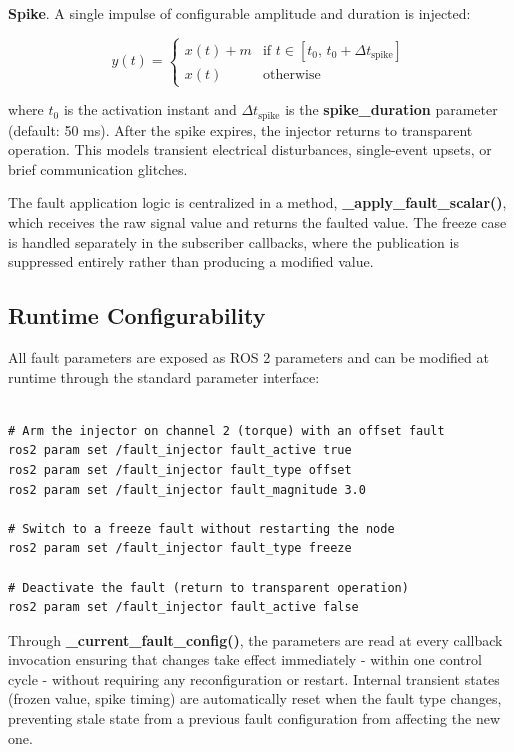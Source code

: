 \textbf{Spike}. A single impulse of configurable amplitude and duration is injected:

\begin{equation}
    y(t) = \begin{cases} x(t) + m & \text{if } t \in [t_0,\, t_0 + \Delta t_{\text{spike}}] \\ x(t) & \text{otherwise} \end{cases}
\end{equation}


where $t_0$ is the activation instant and $\Delta t_{\text{spike}}$ is the \textbf{spike\_duration} parameter (default: 50 ms). After the spike expires, the injector returns to transparent operation. This models transient electrical disturbances, single-event upsets, or brief communication glitches.

The fault application logic is centralized in a method, \textbf{\_apply\_fault\_scalar()}, which receives the raw signal value and returns the faulted value. The freeze case is handled separately in the subscriber callbacks, where the publication is suppressed entirely rather than producing a modified value.

\subsection{Runtime Configurability}
All fault parameters are exposed as ROS 2 parameters and can be modified at runtime through the standard parameter interface:

\begin{verbatim}

# Arm the injector on channel 2 (torque) with an offset fault
ros2 param set /fault_injector fault_active true
ros2 param set /fault_injector fault_type offset
ros2 param set /fault_injector fault_magnitude 3.0

# Switch to a freeze fault without restarting the node
ros2 param set /fault_injector fault_type freeze

# Deactivate the fault (return to transparent operation)
ros2 param set /fault_injector fault_active false

\end{verbatim}

Through \textbf{\_current\_fault\_config()}, the parameters are read at every callback invocation ensuring that changes take effect immediately - within one control cycle - without requiring any reconfiguration or restart. Internal transient states (frozen value, spike timing) are automatically reset when the fault type changes, preventing stale state from a previous fault configuration from affecting the new one.

